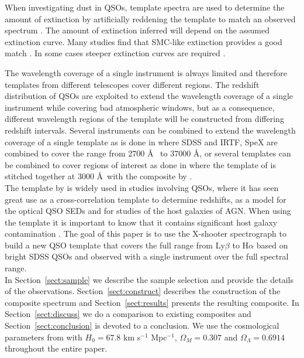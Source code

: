 \documentclass{aa}    %
\newcommand{\sectionname}{Section}
\newcommand{\Sect}[1]{\sectionname~\ref{sect:#1}}
\newcommand{\sect}[1]{\Sect{#1}}
\begin{document}
When investigating dust in QSOs, template spectra are used to determine the
amount of extinction by artificially reddening the template 
to match an observed spectrum 
\citep[e.g.,][]{Glikman2007,Urrutia2009,Wang2012,Fynbo2013,Krogager2015}. 
The amount of extinction inferred will depend on the
assumed extinction curve. Many studies find that SMC-like extinction provides
a good match \citep{Richards2003,Hopkins2004}. In some cases steeper extinction
curves are required \citep{Fynbo2013,Jiang2013,Leighly2014}.

The wavelength coverage of a single instrument is always limited and therefore
templates from different telescopes cover different regions. The redshift
distribution of QSOs are exploited to extend the wavelength coverage of a
single instrument while covering bad atmospheric windows, but as a consequence, different wavelength regions of the template will be constructed from differing
redshift intervals. Several instruments can be combined to extend the wavelength
coverage of a single template as is done in \citet{Glikman2006} where SDSS\citep{Gunn2006} and IRTF, SpeX\citep{Rayner2003} are combined to
cover the range from 2700 \AA~ to 37000 \AA, or several templates can be
combined to cover regions of interest as done in \citep{Zhou2010} where the
template of \citet{VandenBerk2001} is stitched together at 3000
\AA~with the composite by \citet{Glikman2006}. \\
The template by \citet{VandenBerk2001} is widely
used in studies involving QSOs, where it has seen great use as a
cross-correlation template to determine redshifts\citep{Stoughton2002, Rafiee2011}, as a model for the optical QSO SEDs\citep{Croom2004, Hopkins2006, Hopkins2007} and for studies of the host galaxies of AGN\citep{Kauffmann2003b}. When using the \citet{VandenBerk2001} template
it is important to know that it contains significant host galaxy contamination
\citep[e.g.,][their Fig.~5]{Fynbo2013}. The goal of this paper is to use the X-shooter spectrograph to build a new QSO template that covers the full range from Ly$\beta$ to H$\alpha$ based on bright
SDSS QSOs and observed with a single instrument over the full spectral range. \\
In \sect{sample} we describe the sample selection and provide the details 
of the observations. \sect{construct} describes the construction of the composite spectrum
and \sect{results} presents the resulting composite. In \sect{discuss} we do a
comparison to existing composites and \sect{conclusion} is devoted to a
conclusion. We use the cosmological parameters from \citet{Ade2014} with $H_{0} = 67.8$ km s$^{-1}$ Mpc$^{-1}$, $\Omega_{M} = 0.307$ and $\Omega_{\Lambda} = 0.6914$ throughout the entire paper. 
\end{document}
